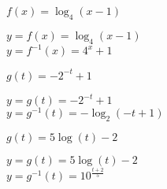 \documentclass{ximera}
\begin{document}
\begin{question}
\begin{problem}
$f(x) = \log_{4}(x - 1)$

\begin{solution}
    $y = f(x) = \log_{4}(x - 1)$\\
{\boldmath $y = f^{-1}(x) = 4^{x} + 1$}\\
\end{solution}
\end{problem}

\begin{problem}
$g(t)= -2^{-t} + 1$

\begin{solution}
    $y = g(t) = -2^{-t} + 1$\\
{ \boldmath $y = g^{-1}(t) = -\log_{2}(-t+1)$} \\
\end{solution}
\end{problem}

\begin{problem}\label{inverselogexplast}
$g(t) = 5\log(t) - 2$ 

\begin{solution}
    $y = g(t) = 5\log(t) - 2$\\
{\boldmath $y = g^{-1}(t) = 10^{\frac{t + 2}{5}}$}\\
\end{solution}
\end{problem}

\end{question}
\end{document}
